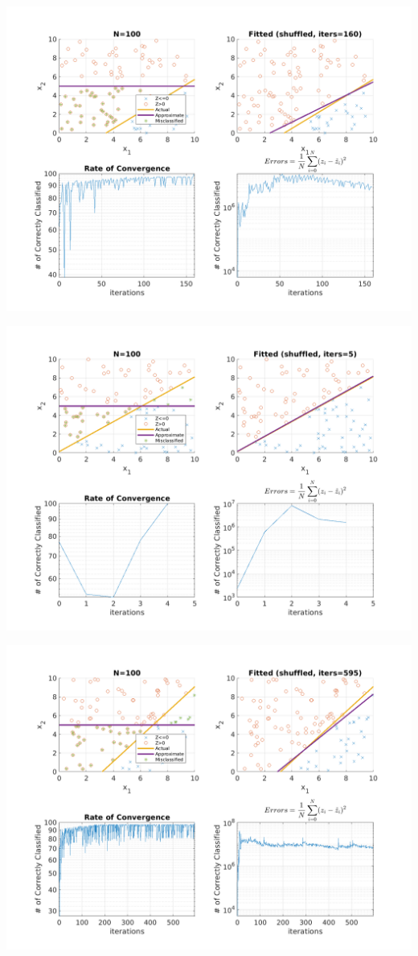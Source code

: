 \documentclass{article}
\newenvironment{Figure}
  {\par\medskip\noindent\minipage{\linewidth}}
  {\endminipage\par\medskip}
\begin{document}
\begin{multicols}{2}
\begin{Figure}
\centering
\includegraphics[width=\linewidth]{pngs/n100_shuffled1.png}
\end{Figure}
\begin{Figure}
\centering
\includegraphics[width=\linewidth]{pngs/n100_shuffled2.png}
\end{Figure}
\begin{Figure}
\centering
\includegraphics[width=\linewidth]{pngs/n100_shuffled3.png}

\end{Figure}
\end{multicols}
\end{document}
